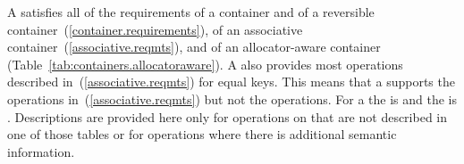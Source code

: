\pnum
A
 satisfies all of the requirements of a container and of a
reversible container~(\ref{container.requirements}), of an associative
container~(\ref{associative.reqmts}), and of an allocator-aware container
(Table~\ref{tab:containers.allocatoraware}).
A
also provides most operations described in~(\ref{associative.reqmts})
for equal keys.
This means that a
supports the
operations in~(\ref{associative.reqmts})
but not the
operations.
For a
the
is
and the
is
.
Descriptions are provided here only for operations on
that are not described in one of those tables
or for operations where there is additional semantic information.


